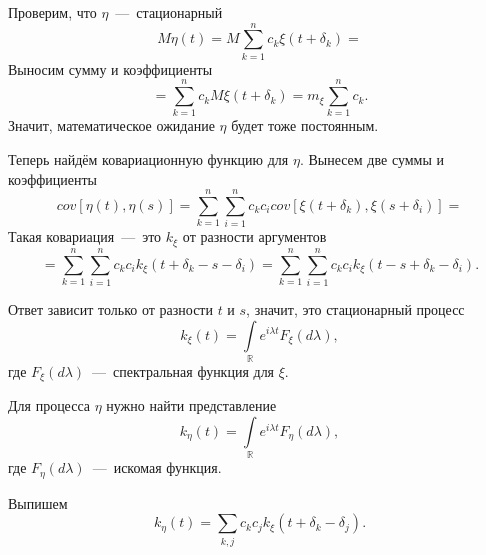 Проверим, что $ \eta $~---~стационарный
\begin{equation*}
  M \eta \left( t \right) =
  M \sum \limits_{k = 1}^n c_k \xi \left( t + \delta_k \right) =
\end{equation*}
Выносим сумму и коэффициенты
\begin{equation*}
  = \sum \limits_{k = 1}^n c_k M \xi \left( t + \delta_k \right) =
  m_{ \xi } \sum \limits_{k = 1}^n c_k.
\end{equation*}
Значит, математическое ожидание $ \eta $ будет тоже постоянным.

Теперь найдём ковариационную функцию для $ \eta $.
Вынесем две суммы и коэффициенты
\begin{equation*}
  cov \left[ \eta \left( t \right), \eta \left( s \right) \right] =
  \sum \limits_{k = 1}^n
    \sum \limits_{i = 1}^n
      c_k c_i cov \left[ \xi \left( t + \delta_k \right), \xi \left( s + \delta_i \right) \right] =
\end{equation*}
Такая ковариация~---~это $k_{ \xi }$ от разности аргументов
\begin{equation*}
  = \sum \limits_{k = 1}^n
    \sum \limits_{i = 1}^n c_k c_i k_{ \xi } \left( t + \delta_k - s - \delta_i \right)=
  \sum \limits_{k = 1}^n
    \sum \limits_{i = 1}^n c_k c_i k_{ \xi } \left( t - s + \delta_k - \delta_i \right).
\end{equation*}

Ответ зависит только от разности $t$ и $s$, значит, это стационарный процесс
\begin{equation*}
  k_{ \xi } \left( t \right) =
  \int \limits_{ \mathbb{R}} e^{i \lambda t} F_{ \xi } \left( d \lambda \right),
\end{equation*}
где $F_{ \xi } \left( d \lambda \right) $~---~спектральная функция для $ \xi $.

Для процесса $ \eta $ нужно найти представление
\begin{equation*}
  k_{ \eta } \left( t \right) =
  \int \limits_{ \mathbb{R}} e^{i \lambda t} F_{ \eta } \left( d \lambda \right),
\end{equation*}
где $F_{ \eta } \left( d \lambda \right) $~---~искомая функция.

Выпишем
\begin{equation*}
  k_{ \eta } \left( t \right) =
  \sum \limits_{k, j} c_k c_j k_{ \xi } \left( t + \delta_k - \delta_j \right).
\end{equation*}

